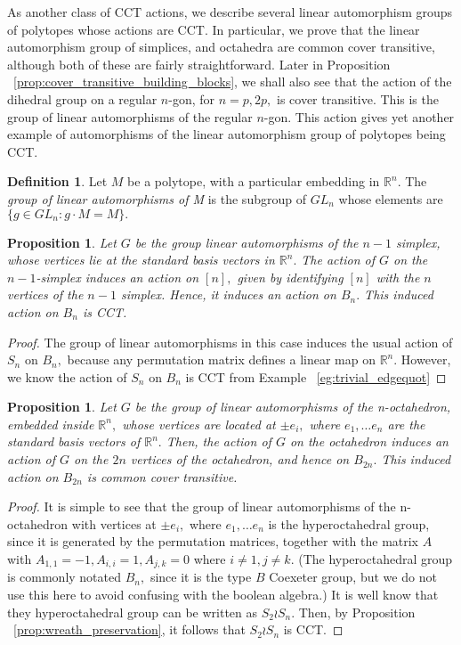 \documentclass[10 pt]{amsart}
\theoremstyle{plain}
\newtheorem{prop}[thm]{Proposition}
\theoremstyle{definition}
\newtheorem{defn}[thm]{Definition}
\theoremstyle{remark}
\numberwithin{equation}{section}
\newcommand\BR{{\mathbb R}}
\begin{document}
As another class of CCT actions, we describe several linear automorphism groups of polytopes whose actions are CCT. In particular, we prove that the linear automorphism group of simplices, and octahedra are common cover transitive, although both of these are fairly straightforward.
Later in Proposition ~\ref{prop:cover_transitive_building_blocks}, we shall also see that the action of the dihedral group on a regular $n$-gon, for $n = p,2p,$ is cover transitive. This is the group of linear automorphisms of the regular $n$-gon. This action gives yet another example of automorphisms of the linear automorphism group of polytopes being CCT.

\begin{defn}
Let $M$ be a polytope, with a particular embedding in $\BR^n.$ The {\it group of linear automorphisms of M} is the subgroup of $GL_n$ whose elements are $\{g \in GL_n:g \cdot M = M\}.$
\end{defn}

\begin{prop}
Let $G$ be the group linear automorphisms of the $n-1$ simplex, whose vertices lie at the standard basis vectors in $\BR^n.$ The action of $G$ on the $n-1$-simplex induces an action on $[n],$ given by identifying $[n]$ with the $n$ vertices of the $n-1$ simplex. Hence, it induces an action on $B_n.$ This induced action on $B_n$ is CCT.
\end{prop}
\begin{proof}
The group of linear automorphisms in this case induces the usual action of $S_n$ on $B_n,$ because any permutation matrix defines a linear map on $\BR^n.$ However, we know the action of $S_n$ on $B_n$ is CCT from Example ~\ref{eg:trivial_edgequot}
\end{proof}

\begin{prop}
Let $G$ be the group of linear automorphisms of the n-octahedron, embedded inside $\BR^n,$ whose vertices are located at $\pm e_i,$ where $e_1,\ldots e_n$ are the standard basis vectors of $\BR^n.$ Then, the action of $G$ on the octahedron induces an action of $G$ on the $2n$ vertices of the octahedron, and hence on $B_{2n}.$ This induced action on $B_{2n}$ is common cover transitive. 
\end{prop}
\begin{proof}
It is simple to see that the group of linear automorphisms of the n-octahedron with vertices at $\pm e_i,$ where $e_1,\ldots e_n$ is the hyperoctahedral group, since it is generated by the permutation matrices, together with the matrix $A$ with $A_{1,1} = -1,A_{i,i} = 1,A_{j,k} = 0$ where $i \neq 1, j \neq k.$ (The hyperoctahedral group is commonly notated $B_n,$ since it is the type $B$ Coexeter group, but we do not use this here to avoid confusing with the boolean algebra.) It is well know that they hyperoctahedral group can be written as $S_2 \wr S_n.$ Then, by Proposition ~\ref{prop:wreath_preservation}, it follows that $S_2 \wr S_n$ is CCT.
\end{proof}
\end{document}
